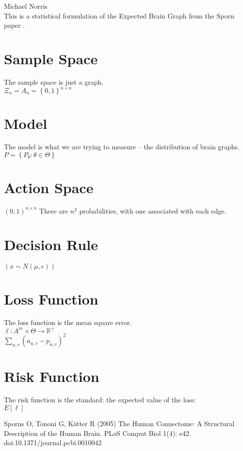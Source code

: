 \documentclass{article}
\author{Michael Norris}
\begin{document}
\newcommand{\tab}{\hspace*{2em}}
\noindent Michael Norris\\
This is a statistical formulation of the Expected Brain Graph from the Sporn
paper \cite{sporn05a}.

\section{Sample Space}
The sample space is just a graph.\\
$\Xi_{n} = A_{n} = \left\{0, 1\right\}^{n \times n}$\\

\section{Model}
The model is what we are trying to measure -- the distribution of brain graphs.
$P = \left\{P_{\theta} : \theta \in \Theta\right\}$\\

\section{Action Space}
$(0, 1)^{n \times n}$
There are $n^{2}$ probabilities, with one associated with each edge.\\

\section{Decision Rule}
$(x \sim N(\mu, \epsilon))$

\section{Loss Function}
The loss function is the mean square error.\\
$\ell : A^{m} \times \Theta \rightarrow \mathbb{R}^{+}$\\
$\sum_{u, v}(a_{u, v} - p_{u,v})^{2}$\\

\section{Risk Function}
The risk function is the standard: the expected value of the loss:\\
$E[\ell]$\\

\begin{thebibliography}{9}
Sporns O, Tononi G, Kötter R (2005) The Human Connectome: A Structural
Description of the Human Brain. PLoS Comput Biol 1(4): e42.
doi:10.1371/journal.pcbi.0010042

\end{thebibliography}
\end{document}
